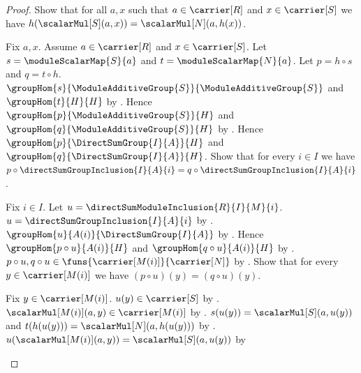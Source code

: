 \begin{proof}
    Show that for all $a,x$ such that $a\in\carrier[R]$ and
        $x\in\carrier[S]$ we have
        $h(\scalarMul[S](a,x))=\scalarMul[N](a,h(x))$.
    \begin{subproof}
        Fix $a,x$.
        Assume $a\in\carrier[R]$ and $x\in\carrier[S]$.
        Let $s=\moduleScalarMap{S}{a}$ and
            $t=\moduleScalarMap{N}{a}$.
        Let $p=h\circ s$ and $q=t\circ h$.
        $\groupHom{s}{\ModuleAdditiveGroup{S}}{
            \ModuleAdditiveGroup{S}}$ and
            $\groupHom{t}{H}{H}$ by
            .
        Hence $\groupHom{p}{\ModuleAdditiveGroup{S}}{H}$ and
            $\groupHom{q}{\ModuleAdditiveGroup{S}}{H}$ by
            .
        Hence $\groupHom{p}{\DirectSumGroup{I}{A}}{H}$ and
            $\groupHom{q}{\DirectSumGroup{I}{A}}{H}$.
        Show that for every $i\in I$ we have
            $p\circ\directSumGroupInclusion{I}{A}{i}
                =q\circ\directSumGroupInclusion{I}{A}{i}$.
        \begin{subproof}
            Fix $i\in I$.
            Let $u=\directSumModuleInclusion{R}{I}{M}{i}$.
            $u=\directSumGroupInclusion{I}{A}{i}$ by
                .
            $\groupHom{u}{A(i)}{\DirectSumGroup{I}{A}}$ by
                .
            Hence $\groupHom{p\circ u}{A(i)}{H}$ and
                $\groupHom{q\circ u}{A(i)}{H}$ by
                .
            $p\circ u,q\circ u\in
                \funs{\carrier[M(i)]}{\carrier[N]}$ by
                .
            Show that for every $y\in\carrier[M(i)]$ we have
                $(p\circ u)(y)=(q\circ u)(y)$.
            \begin{subproof}
                Fix $y\in\carrier[M(i)]$.
                $u(y)\in\carrier[S]$ by
                    .
                $\scalarMul[M(i)](a,y)\in\carrier[M(i)]$ by
                    .
                $s(u(y))=\scalarMul[S](a,u(y))$ and
                    $t(h(u(y)))=\scalarMul[N](a,h(u(y)))$ by
                    .
                $u(\scalarMul[M(i)](a,y))
                    =\scalarMul[S](a,u(y))$ by
\end{subproof}
\end{subproof}
\end{subproof}
\end{proof}
